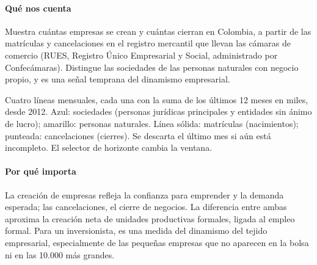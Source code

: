 \paragraph{Qué nos cuenta}
Muestra cuántas empresas se crean y cuántas cierran en Colombia, a partir de las matrículas y cancelaciones en el registro mercantil que llevan las cámaras de comercio (RUES, Registro Único Empresarial y Social, administrado por Confecámaras). Distingue las sociedades de las personas naturales con negocio propio, y es una señal temprana del dinamismo empresarial.

\begin{leer}
Cuatro líneas mensuales, cada una con la suma de los últimos 12 meses en miles, desde 2012. Azul: sociedades (personas jurídicas principales y entidades sin ánimo de lucro); amarillo: personas naturales. Línea sólida: matrículas (nacimientos); punteada: cancelaciones (cierres). Se descarta el último mes si aún está incompleto. El selector de horizonte cambia la ventana.
\end{leer}

\paragraph{Por qué importa}
La creación de empresas refleja la confianza para emprender y la demanda esperada; las cancelaciones, el cierre de negocios. La diferencia entre ambas aproxima la creación neta de unidades productivas formales, ligada al empleo formal. Para un inversionista, es una medida del dinamismo del tejido empresarial, especialmente de las pequeñas empresas que no aparecen en la bolsa ni en las 10.000 más grandes.

